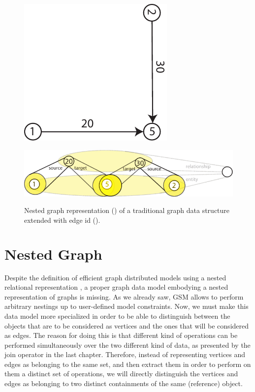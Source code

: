 \begin{figure}[!t]
	\centering
	\begin{minipage}{0.3\textwidth}
		\centering
		\includegraphics[scale=0.6]{fig/04model/05graphs}
		\label{subfig:traditionalgraphtoNest}
	\end{minipage}\qquad \begin{minipage}{0.6\textwidth}
		\centering
		\includegraphics[scale=0.8]{fig/04model/05nested}
		\label{subfig:nestedreprofgraph}
	\end{minipage}
	\caption{Nested graph representation () of a traditional graph data structure extended with edge id ().}
	\label{subfig:representableGraphs}
\end{figure}
\section{Nested Graph}\label{def:ngraph}
Despite the definition of efficient graph distributed models using a nested relational representation \cite{Labouseur2015}, a proper graph data model embodying a nested representation of graphs is missing. As we already saw, GSM allows to perform arbitrary nestings up to user-defined model constraints.  Now, we must make this data model more specialized in order to be able to distinguish between the objects that are to be considered as vertices and the ones that will be considered as edges. The reason for doing this is that different kind of operations can be performed simultaneously over the two different kind of data, as presented by the join operator in the last chapter. Therefore, instead of representing vertices and edges as belonging to the same set, and then extract them in order to perform on them a distinct set of operations, we will directly distinguish the vertices and edges as belonging to two distinct containments of the same (reference) object.

